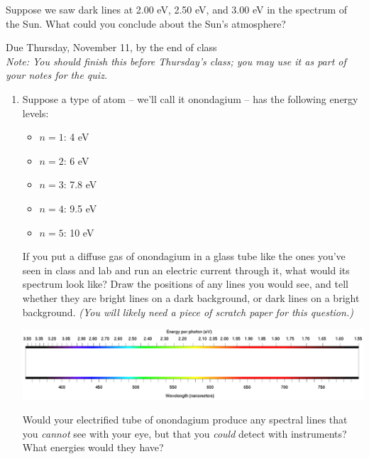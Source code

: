 \documentclass[12pt]{article}
\begin{document}
Suppose we saw dark lines at 2.00 eV, 2.50 eV, and 3.00 eV in the spectrum of the Sun. What could you conclude about the Sun's atmosphere?


\newpage

\centerline{}
	
	\normalsize
	\begin{center}
		Due Thursday, November 11, by the end of class\\
		\small \it Note: You should finish this before Thursday's class; you may use it as part of your notes for the quiz.
	\end{center}
	
	\bigskip
	
	\begin{enumerate}
		
		
		\item Suppose a type of atom -- we'll call it onondagium -- has the following energy levels:
		\begin{itemize}
			\item $n=1$: 4 eV
			\item $n=2$: 6 eV
			\item $n=3$: 7.8 eV
			\item $n=4$: 9.5 eV
			\item $n=5$: 10 eV
		\end{itemize}
		
		If you put a diffuse gas of onondagium in a glass tube like the ones you've seen in class and lab and run an electric current through it, what would its spectrum look like? Draw the positions of any lines you would see, and tell whether they are bright lines on a dark background, or dark lines on a bright background. {\it (You will likely need a piece of scratch paper for this question.)}
		
		\includegraphics[width=7in]{spectrum-blank.png}
		\vspace{1in}
		
		Would your electrified tube of onondagium produce any spectral lines that you {\it cannot} see with your eye, but that you {\it could} detect with instruments? What energies would they have?
		
		\newpage
		

\end{enumerate}
\end{document}
